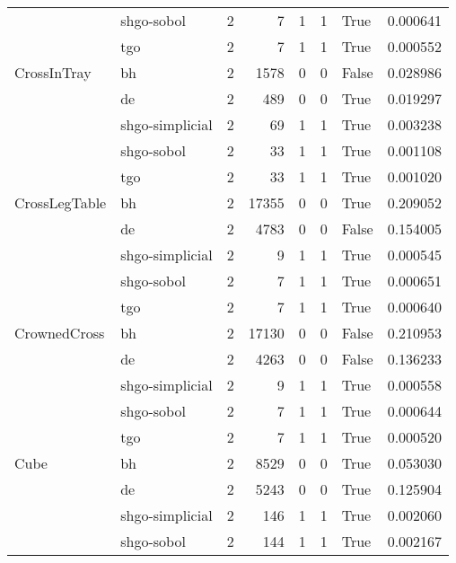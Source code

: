 \begin{longtable}{llrrrrlr}
         & shgo-sobol &     2 &        7 &      1 &       1 &    True &    0.000641 \\
         & tgo &     2 &        7 &      1 &       1 &    True &    0.000552 \\
CrossInTray & bh &     2 &     1578 &      0 &       0 &   False &    0.028986 \\
         & de &     2 &      489 &      0 &       0 &    True &    0.019297 \\
         & shgo-simplicial &     2 &       69 &      1 &       1 &    True &    0.003238 \\
         & shgo-sobol &     2 &       33 &      1 &       1 &    True &    0.001108 \\
         & tgo &     2 &       33 &      1 &       1 &    True &    0.001020 \\
CrossLegTable & bh &     2 &    17355 &      0 &       0 &    True &    0.209052 \\
         & de &     2 &     4783 &      0 &       0 &   False &    0.154005 \\
         & shgo-simplicial &     2 &        9 &      1 &       1 &    True &    0.000545 \\
         & shgo-sobol &     2 &        7 &      1 &       1 &    True &    0.000651 \\
         & tgo &     2 &        7 &      1 &       1 &    True &    0.000640 \\
CrownedCross & bh &     2 &    17130 &      0 &       0 &   False &    0.210953 \\
         & de &     2 &     4263 &      0 &       0 &   False &    0.136233 \\
         & shgo-simplicial &     2 &        9 &      1 &       1 &    True &    0.000558 \\
         & shgo-sobol &     2 &        7 &      1 &       1 &    True &    0.000644 \\
         & tgo &     2 &        7 &      1 &       1 &    True &    0.000520 \\
Cube & bh &     2 &     8529 &      0 &       0 &    True &    0.053030 \\
         & de &     2 &     5243 &      0 &       0 &    True &    0.125904 \\
         & shgo-simplicial &     2 &      146 &      1 &       1 &    True &    0.002060 \\
         & shgo-sobol &     2 &      144 &      1 &       1 &    True &    0.002167 \\

\end{longtable}
